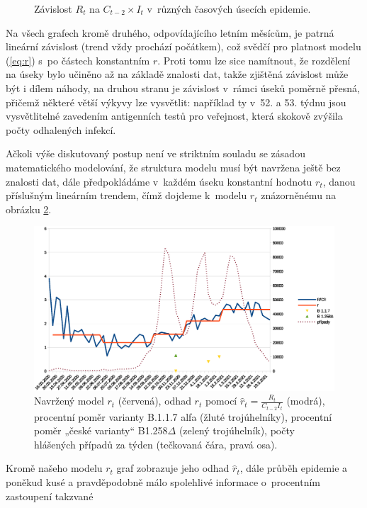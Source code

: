 \begin{figure}
\begin{center}
\caption{Závislost $R_t$ na $C_{t-2} \times I_t$ v~různých časových úsecích epidemie.}
\label{fig:xy5}
\end{center}
\end{figure}
Na všech grafech kromě druhého, odpovídajícího letním měsícům, je patrná lineární závislost (trend
vždy prochází počátkem), což svědčí pro platnost
modelu (\ref{eq:r}) s~po částech konstantním $r$. Proti tomu lze sice namítnout,
že rozdělení na úseky bylo učiněno až na základě znalosti dat, takže zjištěná závislost může být i dílem náhody, na druhou stranu je závislost v~rámci úseků poměrně přesná, přičemž některé větší výkyvy lze vysvětlit: například ty v~52. a 53.
týdnu jsou vysvětlitelné zavedením antigenních testů pro veřejnost,
která skokově zvýšila počty odhalených infekcí. 

Ačkoli výše diskutovaný postup není ve striktním souladu se zásadou matematického modelování, že struktura modelu musí být navržena ještě bez znalosti dat, dále předpokládáme v~každém úseku konstantní hodnotu $r_{t}$,
danou příslušným lineárním trendem, čímž dojdeme k~modelu $r_{t}$ znázorněnému na obrázku \ref{fig:model}.
\begin{figure}
\begin{center}
\includegraphics[scale=0.4]{pic/whole}
\caption{Navržený model $r_t$ (červená), odhad $r_t$ pomocí $\hat{r}_t = \frac{R_{t}}{C_{t-2}I_{t}}$ (modrá), procentní poměr varianty B.1.1.7 alfa (žluté trojúhelníky), procentní poměr „české varianty“ B1.258$\Delta$ (zelený trojúhelník), počty hlášených případů za týden (tečkovaná čára, pravá osa).}
\label{fig:model}
\end{center}
\end{figure}
Kromě našeho modelu $r_t$ graf zobrazuje jeho odhad $\hat r_t$, dále průběh epidemie a poněkud kusé a pravděpodobně málo spolehlivé informace o~procentním zastoupení takzvané
